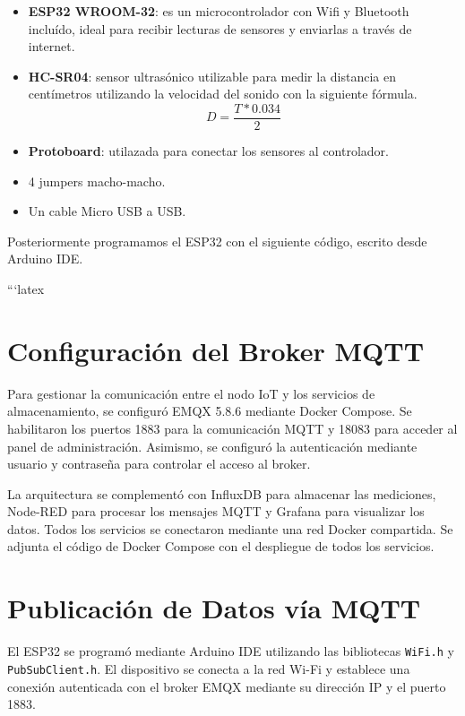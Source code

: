 \documentclass[a4paper, spanish]{article}
\begin{document}
    \begin{itemize}
      \item \textbf{ESP32 WROOM-32}: es un microcontrolador
      con Wifi y Bluetooth incluído, ideal para recibir lecturas
      de sensores y enviarlas a través de internet.
      \item \textbf{HC-SR04}: sensor ultrasónico utilizable para
      medir la distancia en centímetros utilizando la velocidad del
      sonido con la siguiente fórmula.
      \begin{equation}
        D = \frac{T * 0.034}{2}
      \end{equation}
      \item \textbf{Protoboard}: utilazada para conectar los
      sensores al controlador.
      \item 4 jumpers macho-macho.
      \item Un cable Micro USB a USB.
    \end{itemize}

    Posteriormente programamos el ESP32 con el siguiente código,
    escrito desde Arduino IDE.

  

```latex
\section{Configuración del Broker MQTT}

Para gestionar la comunicación entre el nodo IoT y los servicios de almacenamiento, se configuró EMQX 5.8.6 mediante Docker Compose. Se habilitaron los puertos 1883 para la comunicación MQTT y 18083 para acceder al panel de administración. Asimismo, se configuró la autenticación mediante usuario y contraseña para controlar el acceso al broker.

La arquitectura se complementó con InfluxDB para almacenar las mediciones, Node-RED para procesar los mensajes MQTT y Grafana para visualizar los datos. Todos los servicios se conectaron mediante una red Docker compartida. Se adjunta el código de Docker Compose con el despliegue de todos los servicios.

  

\section{Publicación de Datos vía MQTT}

El ESP32 se programó mediante Arduino IDE utilizando las bibliotecas \texttt{WiFi.h} y \texttt{PubSubClient.h}. El dispositivo se conecta a la red Wi-Fi y establece una conexión autenticada con el broker EMQX mediante su dirección IP y el puerto 1883.
\end{document}
